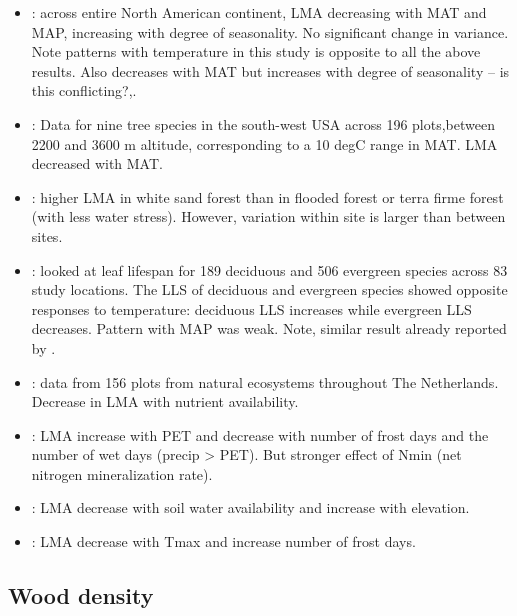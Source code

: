 \documentclass[a4paper,11pt]{article}
\begin{document}
\begin{itemize}
\item \citet{Simova-2015}: across entire North American continent, LMA decreasing with MAT and MAP, increasing with degree of seasonality. No significant change in variance. Note patterns with temperature in this study is opposite to all the above results. Also decreases with MAT but increases with degree of seasonality -- is this conflicting?,.  

\item \citet{Laughlin-2012}: Data for nine tree species in the south-west USA across 196 plots,between 2200 and 3600 m altitude, corresponding to a 10 degC range in MAT. LMA decreased with MAT.

\item \citet{Fortunel-2014}: higher LMA  in white sand forest than in flooded forest or terra firme forest (with less water stress). However, variation within site is larger than between sites.

\item \citet{vanOmmenKloeke-2012}: looked at leaf lifespan for 189 deciduous and 506 evergreen species across 83 study locations. The LLS of deciduous and evergreen species showed opposite responses to temperature: deciduous LLS increases while evergreen LLS decreases. Pattern with MAP was weak. Note, similar result already reported by \citet{Wright-2005}.

\item \citet{Douma-2011}: data from 156 plots from natural ecosystems throughout The Netherlands.  Decrease in LMA with nutrient availability.

\item \citet{VanBodegom-2014}: LMA increase with PET and decrease with number of frost days and the number of wet days (precip > PET). But stronger effect of Nmin (net nitrogen mineralization rate).

\item \citet{Cornwell-2009}: LMA decrease with soil water availability and increase with elevation.

\item \citet{Maire-2015}: LMA decrease with Tmax and increase number of frost days.
\end{itemize}

\subsection{Wood density}
\end{document}
